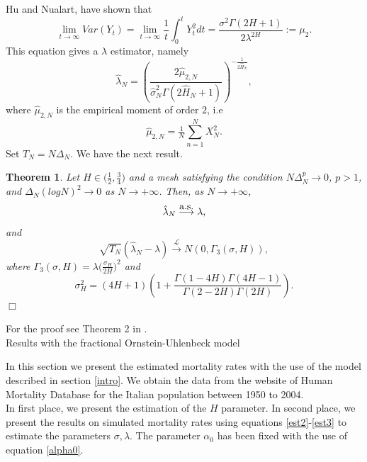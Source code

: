 \documentclass[12pt,reqno]{amsart}
\makeatletter
\def\section{\@startsection{section}{1}%
     \z@{.7\linespacing\@plus\linespacing}{.5\linespacing}%
     {\bfseries
     \centering
     }}
\newtheorem{theorem}{Theorem}[section]
\theoremstyle{definition}
\theoremstyle{remark}
\numberwithin{equation}{section}
\makeatother
\begin{document}
Hu and Nualart, \cite{hu-nu} have shown that
\[
 \lim_{t\rightarrow \infty} Var (Y_t)= \lim_{t\rightarrow \infty} \frac{1}{t}\int_0^t Y_t^2 dt = \frac{\sigma^2 \Gamma(2H+1) }
 {2\lambda^{2H}}:=\mu_2.
\]
This equation gives a $\lambda$ estimator, namely
\begin{equation}
 \hat{\lambda}_N = \left(\frac{2\hat{\mu}_{2,N}}{\hat{\sigma}_N^2 \Gamma(2\hat{H}_N+1) }  \right)^{-\tfrac{1}{2\hat{H}_N}},\label{est3}
\end{equation}
where $\hat{\mu}_{2,N}$ is the empirical moment of order $2$, i.e
\[
 \hat{\mu}_{2,N} =\tfrac{1}{N}\sum_{n=1}^N X_N^2.
\]
Set $T_N=N\Delta_N$. We have the next result.
\begin{theorem}
 Let $H \in \big(\tfrac{1}{2} , \tfrac{3}{4}\big)$ and a mesh satisfying the condition $N \Delta_N^p\rightarrow 0$, $p>1$,
and $ \Delta_N (log N )^2 \rightarrow 0$ as $N \rightarrow +\infty$. Then, as $N \rightarrow +\infty$,
\[
 \hat{\lambda}_N \stackrel{\hbox{\rm a.s.}}{\longrightarrow}  \lambda,
\]
and
\[
 \sqrt{T_N} ( \hat{\lambda}_N -\lambda) \stackrel{\mathcal{L}}{\longrightarrow} N (0, \Gamma_3 (\sigma,H)),
\]
where $\Gamma_3 (\sigma,H)=\lambda \big(\tfrac{\sigma_H}{2H} \big)^2$ and
\[
 \sigma_H^2= (4H+1)\left(1+\frac{\Gamma(1-4H)\Gamma(4H-1) }{\Gamma(2-2H)\Gamma(2H)} \right).
\]
\hfill$\Box$
\end{theorem}
For the proof see Theorem 2 in \cite{br-ia}.\\







\section{Results with the fractional Ornstein-Uhlenbeck model}
\label{re-fou}

In this section we present the estimated mortality rates with the use of the model
described in section \ref{intro}. We obtain the data from the website of Human Mortality Database for the Italian population between 1950 to 2004.\\

In first place, we present the estimation of the $H$ parameter. In second place, we present the results on simulated mortality rates using  equations \eqref{est2}-\eqref{est3} to estimate the parameters $\sigma,\lambda$. The parameter $\alpha_0$ has been fixed with the use of equation \eqref{alpha0}.\\
\end{document}
